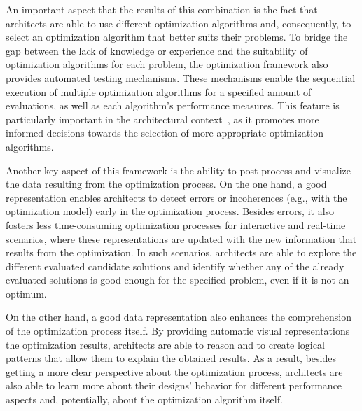An important aspect that the results of this combination is the fact that architects are able to use different optimization algorithms and, consequently, to select an optimization algorithm that better suits their problems. To bridge the gap between the lack of knowledge or experience and the suitability of optimization algorithms for each problem, the optimization framework also provides automated testing mechanisms. These mechanisms enable the sequential execution of multiple optimization algorithms for a specified amount of evaluations, as well as each algorithm's performance measures. This feature is particularly important in the architectural context~\cite{Wortmann2016BBO,Hamdy2016}, as it promotes more informed decisions towards the selection of more appropriate optimization algorithms.

Another key aspect of this framework is the ability to post-process and visualize the data resulting from the optimization process. On the one hand, a good representation enables architects to detect errors or incoherences (e.g., with the optimization model) early in the optimization process. Besides errors, it also fosters less time-consuming optimization processes for interactive and real-time scenarios, where these representations are updated with the new information that results from the optimization. In such scenarios, architects are able to explore the different evaluated candidate solutions and identify whether any of the already evaluated solutions is good enough for the specified problem, even if it is not an optimum.

On the other hand, a good data representation also enhances the comprehension of the optimization process itself. By providing automatic visual representations the optimization results, architects are able to reason and to create logical patterns that allow them to explain the obtained results. As a result, besides getting a more clear perspective about the optimization process, architects are also able to learn more about their designs' behavior for different performance aspects and, potentially, about the optimization algorithm itself.
